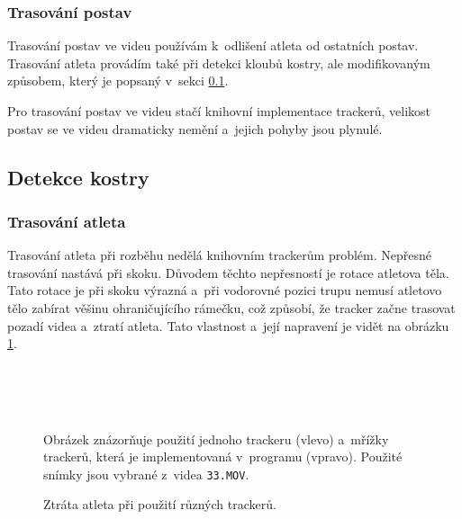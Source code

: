 \subsubsection{Trasování postav}

Trasování postav ve videu používám k~odlišení atleta od ostatních postav. Trasování atleta provádím také při detekci kloubů kostry, ale modifikovaným způsobem, který je popsaný v~sekci \ref{ssec:ndetekce}.

Pro trasování postav ve videu stačí knihovní implementace trackerů, velikost postav se ve videu dramaticky nemění a~jejich pohyby jsou plynulé.



\subsection{Detekce kostry}
\label{ssec:ndetekce}

\subsubsection{Trasování atleta}

Trasování atleta při rozběhu nedělá knihovním trackerům problém. Nepřesné trasování nastává při skoku. Důvodem těchto nepřesností je rotace atletova těla. Tato rotace je při skoku výrazná a~při vodorovné pozici trupu nemusí atletovo tělo zabírat věšinu ohraničujícího rámečku, což způsobí, že tracker začne trasovat pozadí videa a~ztratí atleta. Tato vlastnost a~její napravení je vidět na obrázku \ref{fig:ztrata}.

\begin{figure}[p]\centering
     \\
     \\
     \\
    \caption{Ztráta atleta při použití různých trackerů.}
    \small
    Obrázek znázorňuje použití jednoho trackeru (vlevo) a~mřížky trackerů, která je implementovaná v~programu (vpravo). Použité snímky jsou vybrané z~videa \texttt{33.MOV}.
    \label{fig:ztrata}
\end{figure}

